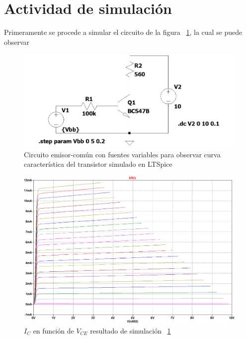 \documentclass[chaptersright]{informeutn}
\begin{document}
  \section{Actividad de simulación}
  Primeramente se procede a simular el circuito de la figura 
  ~\ref{fig:circuito-simulacion-salida}, la cual se puede observar 
      \begin{figure}[H]
          \centering
          \includegraphics[width=1\textwidth, keepaspectratio]{pictures/circuito-simulacion-salida.png}
          \caption{Circuito emisor-común con fuentes variables para observar curva característica del transistor simulado en LTSpice}
          \label{fig:circuito-simulacion-salida}
      \end{figure}
  
      \begin{figure}[H]
          \centering
          \includegraphics[width=1\textwidth, keepaspectratio]{pictures/curva-simulacion-salida.png}
          \caption{$I_C$ en función de $V_{CE}$ resultado de simulación 
          ~\ref{fig:circuito-simulacion-salida}}
      \end{figure}
\end{document}
